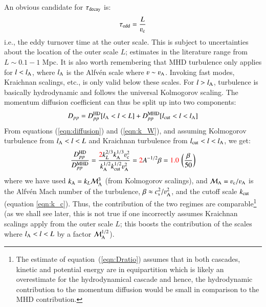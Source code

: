 \documentclass[fleqn,usenatbib,useAMS]{mnras}
\newcommand\cp[1]{{\color{red} #1}}
\begin{document}
An obvious candidate for $\tau_{\rm decay}$ is: 
\begin{equation}
\tau_{\rm edd} = \frac{L}{\varv_{\rm c}}
\end{equation}
i.e., the eddy turnover time at the outer scale. This is subject to
uncertainties about the location of the outer scale $L$; estimates in the
literature range from $L \sim 0.1-1$ Mpc. It is also worth remembering that MHD
turbulence only applies for $l < l_{\rm A}$, where $l_{\rm A}$ is the Alfv{\'e}n
scale where $\varv \sim \varv_{\rm A}$. Invoking fast modes, Kraichnan scalings,
etc., is only valid below these scales. For $l > l_{\rm A}$, turbulence is
basically hydrodynamic and follows the universal Kolmogorov scaling. The
momentum diffusion coefficient can thus be split up into two components:
\begin{equation}
D_{pp} = D_{pp}^{\rm HD}[l_{\rm A} < l < L] + D_{pp}^{\rm MHD}[l_{\rm cut} < l < l_{\rm A}]
\end{equation}
From equations (\ref{eqn:diffusion}) and (\ref{eqn:k_W}), and assuming Kolmogorov turbulence from $l_{\rm A} < l < L$ and Kraichnan turbulence from $l_{\rm cut} < l < l_{\rm A}$, we get: 
\begin{equation}
  \label{eqn:Dratio}
  \frac{D_{pp}^{\rm HD}}{D_{pp}^{\rm MHD}}
  = \frac{\cp{2}k_L^{2/3}k_{\rm A}^{1/3} \varv_{\rm c}^{2}}{k_{\rm A}^{1/2}k_{\rm cut}^{1/2} \varv_{\rm A}^{2}}
  = \cp{2} A^{-1/2} \beta = \cp{1.0}\, \left( \frac{\beta}{50} \right) 
\end{equation}
where we have used $k_{\rm A} = k_L \mathcal{M}_{\rm A}^{3}$ (from Kolmogorov
scalings), and $\mathcal{M}_{\rm A} = \varv_{\rm c}/\varv_{\rm A}$ is the
Alfv{\'e}n Mach number of the turbulence, $\beta \approx c_{\rm
  s}^{2}/\varv_{\rm A}^{2}$, and the cutoff scale $k_{\rm cut}$ (equation
\ref{eqn:k_c}).  Thus, the contribution of the two regimes are
comparable\footnote{\cp{The estimate of equation~(\ref{eqn:Dratio}) assumes that
    in both cascades, kinetic and potential energy are in equipartition which is
    likely an overestimate for the hydrodynamical cascade and hence, the
    hydrodynamic contribution to the momentum diffusion would be small in
    comparison to the MHD contribution. }} (as we shall see later, this is not
true if one incorrectly assumes Kraichnan scalings apply from the outer scale
$L$; this boosts the contribution of the scales where $l_{\rm A} < l < L$ by a
factor $\mathcal{M}_{\rm A}^{1/2}$).
\end{document}
